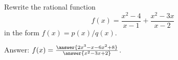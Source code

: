 \documentclass{ximera}
\author{Ivo Terek}
\begin{document}
\begin{exercise}

  Rewrite the rational function $$  f(x) = \frac{x^2-4}{x-1} + \frac{x^2-3x}{x-2}  $$in the form $f(x) = p(x)/q(x)$.

  Answer: $f(x) = \frac{\answer{2x^3-x-6x^2+8}}{\answer{x^2-3x+2}}$.
  
\end{exercise}
\end{document}
